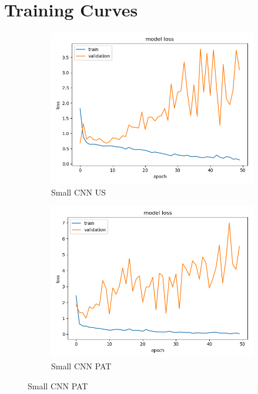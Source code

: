 \section{Training Curves}
\label{result_curves}
\label{section_curves}

\begin{figure}
\centering
\begin{subfigure}[b]{.45\linewidth}
\includegraphics[width=\linewidth]{Figs/small_us_loss.jpg}
\caption{Small CNN US}
\end{subfigure}
\begin{subfigure}[b]{.45\linewidth}
\includegraphics[width=\linewidth]{Figs/small_pat_loss.jpg}
\caption{Small CNN PAT}
\end{subfigure}


\end{figure}
